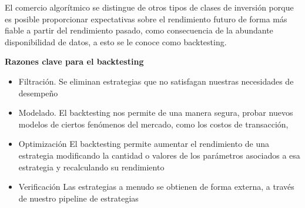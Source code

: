 \documentclass{article}
\begin{document}
El comercio algorítmico se distingue de otros tipos de clases de inversión porque es posible proporcionar expectativas sobre el rendimiento futuro de forma más fiable a partir del rendimiento pasado, como consecuencia de la abundante disponibilidad de datos, a esto se le conoce como backtesting. 

\textbf{Razones clave para el backtesting}
\begin{itemize}
\item Filtración.
Se eliminan estrategias que no satisfagan nuestras necesidades de desempeño
\item Modelado. 
El backtesting nos permite de una manera segura, probar nuevos modelos de ciertos fenómenos del mercado, como los costos de transacción,
\item Optimización
El backtesting permite aumentar el rendimiento de una estrategia modificando la cantidad o valores de los parámetros asociados a esa estrategia y recalculando su rendimiento
\item Verificación
Las estrategias a menudo se obtienen de forma externa, a través de nuestro pipeline de estrategias
\end{itemize}
\end{document}
